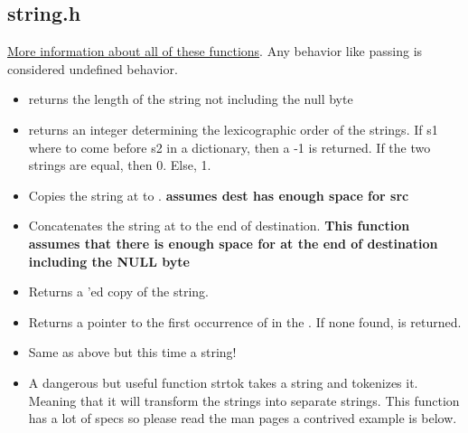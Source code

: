 \subsection{string.h}

\href{https://linux.die.net/man/3/string}{More information about all of these functions}. Any behavior like passing  is considered undefined behavior.

\begin{itemize}

\item {} returns the length of the string not including the null byte

\item {} returns an integer determining the lexicographic order of the strings. If s1 where to come before s2 in a dictionary, then a -1 is returned. If the two strings are equal, then 0. Else, 1.

\item {} Copies the string at  to . \textbf{assumes dest has enough space for src}

\item {} Concatenates the string at  to the end of destination. \textbf{This function assumes that there is enough space for  at the end of destination including the NULL byte}

\item {} Returns a 'ed copy of the string.

\item {} Returns a pointer to the first occurrence of  in the . If none found,  is returned.

\item {} Same as above but this time a string!

\item {}

 A dangerous but useful function strtok takes a string and tokenizes it. Meaning that it will transform the strings into separate strings. This function has a lot of specs so please read the man pages a contrived example is below.


\end{itemize}
